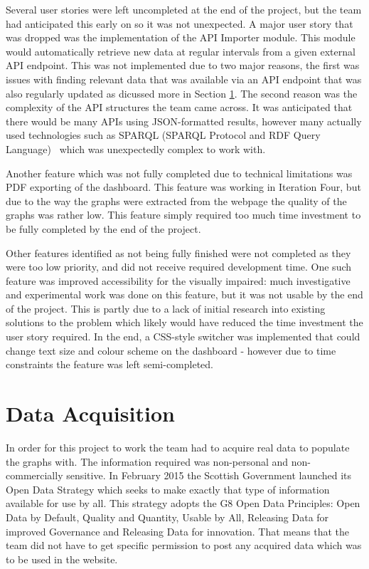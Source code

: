 \documentclass{l3proj}
\begin{document}
Several user stories were left uncompleted at the end of the project, but the team had anticipated this early on so it was not unexpected. A major user story that was dropped was the implementation of the API Importer module. This module would automatically retrieve new data at regular intervals from a given external API endpoint. This was not implemented due to two major reasons, the first was issues with finding relevant data that was available via an API endpoint that was also regularly updated as dicussed more in Section \ref{sec:data-acquisition}. The second reason was the complexity of the API structures the team came across. It was anticipated that there would be many APIs using JSON-formatted results, however many actually used technologies such as SPARQL (SPARQL Protocol and RDF Query Language)~\cite{W3SPARQL} which was unexpectedly complex to work with.

Another feature which was not fully completed due to technical limitations was PDF exporting of the dashboard. This feature was working in Iteration Four, but due to the way the graphs were extracted from the webpage the quality of the graphs was rather low. This feature simply required too much time investment to be fully completed by the end of the project.

Other features identified as not being fully finished were not completed as they were too low priority, and did not receive required development time. One such feature was improved accessibility for the visually impaired: much investigative and experimental work was done on this feature, but it was not usable by the end of the project. This is partly due to a lack of initial research into existing solutions to the problem which likely would have reduced the time investment the user story required. In the end, a CSS-style switcher was implemented that could change text size and colour scheme on the dashboard - however due to time constraints the feature was left semi-completed.



\section{Data Acquisition}
\label{sec:data-acquisition}

In order for this project to work the team had to acquire real data to populate the graphs with. The information required was non-personal and non-commercially sensitive. In February 2015 the Scottish Government launched its Open Data Strategy which seeks to make exactly that type of information available for use by all. This strategy adopts the G8 Open Data Principles: Open Data by Default, Quality and Quantity, Usable by All, Releasing Data for improved Governance and Releasing Data for innovation. That means that the team did not have to get specific permission to post any acquired data which was to be used in the website.
\end{document}
